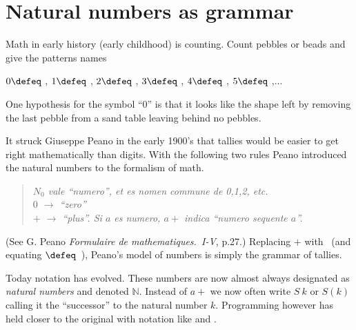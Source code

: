 \section{Natural numbers as grammar}
Math in early history (early childhood) is counting.  Count 
pebbles or beads and give the patterns names
\begin{center}
    $0\defeq$ \underline{\hspace{5mm}}, 
    $1\defeq$ \StrokeOne,
    $2\defeq$ \StrokeTwo,
    $3\defeq$ \StrokeThree,
    $4\defeq$ \StrokeFour,
    $5\defeq$ \StrokeFive,...
\end{center}
One hypothesis for the symbol
``0'' is that it looks like the shape left by removing the last pebble from
a sand table leaving behind no pebbles.

It struck Giuseppe Peano in the early 1900's that tallies would be easier to get
right mathematically than digits. With the following two rules Peano introduced
the natural numbers to the formalism of math.
\begin{quote}
    \textit{
    $N_0$ vale ``numero'', et es nomen commune de 0,1,2, etc.\\
    $0$ $\to$  ``zero''\\
    $+$ $\to$ ``plus''.  Si $a$ es numero, $a+$ indica ``numero sequente $a$''.
    }
\end{quote}
(See G. Peano \emph{Formulaire de mathematiques.~I-V}, p.27.)
Replacing $+$ with \StrokeOne ~(and equating \StrokeFive$\defeq$\StrokeFour~\StrokeOne),
Peano's model of numbers is simply the grammar of tallies.

Today notation has evolved.  These numbers are now almost always designated as
\emph{natural numbers} and denoted $\mathbb{N}$.  Instead of $a+$ we now often
write $S~k$  or $S(k)$ calling it the ``successor'' to the natural number $k$.  
Programming however has held closer to the original with notation like 
 and .


